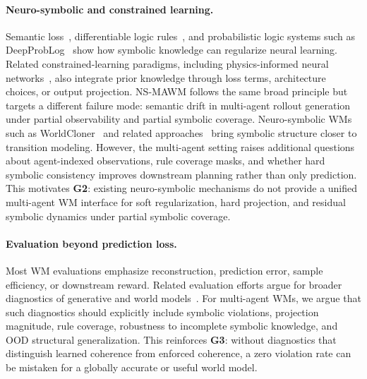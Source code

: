 \documentclass{article}
\theoremstyle{plain}
\theoremstyle{definition}
\theoremstyle{remark}
\begin{document}
\paragraph{Neuro-symbolic and constrained learning.}
Semantic loss~\cite{Xu2018semanticloss}, differentiable logic rules~\cite{Fan2017differentiablelearninglogicalrules}, and probabilistic logic systems such as DeepProbLog~\cite{manhaeve2018deepproblog} show how symbolic knowledge can regularize neural learning. Related constrained-learning paradigms, including physics-informed neural networks~\cite{raissi2019physicsinformed}, also integrate prior knowledge through loss terms, architecture choices, or output projection. NS-MAWM follows the same broad principle but targets a different failure mode: semantic drift in multi-agent rollout generation under partial observability and partial symbolic coverage. Neuro-symbolic WMs such as WorldCloner~\cite{balloch2023neurosymbolicworldmodelsadapting} and related approaches~\cite{agravante-etal-2023-learning} bring symbolic structure closer to transition modeling. However, the multi-agent setting raises additional questions about agent-indexed observations, rule coverage masks, and whether hard symbolic consistency improves downstream planning rather than only prediction.
This motivates \textbf{G2}: existing neuro-symbolic mechanisms do not provide a unified multi-agent WM interface for soft regularization, hard projection, and residual symbolic dynamics under partial symbolic coverage.

\paragraph{Evaluation beyond prediction loss.}
Most WM evaluations emphasize reconstruction, prediction error, sample efficiency, or downstream reward. Related evaluation efforts argue for broader diagnostics of generative and world models~\cite{Duan_2025_ICCV,Delvecchio2025p1157}. For multi-agent WMs, we argue that such diagnostics should explicitly include symbolic violations, projection magnitude, rule coverage, robustness to incomplete symbolic knowledge, and OOD structural generalization.
This reinforces \textbf{G3}: without diagnostics that distinguish learned coherence from enforced coherence, a zero violation rate can be mistaken for a globally accurate or useful world model.
\end{document}
